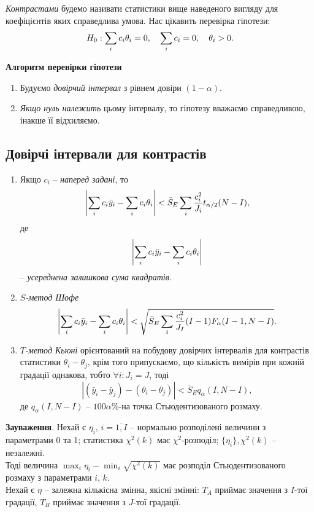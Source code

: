\textit{Контрастами} будемо називати статистики вище наведеного вигляду для коефіцієнтів яких справедлива умова. Нас цікавить перевірка гіпотези: \[H_0: \displaystyle\sum\limits_i c_i\theta_i=0, \quad \displaystyle\sum\limits_ic_i=0, \quad \theta_i>0.\]

\textbf{Алгоритм перевірки гіпотези}
\begin{enumerate}
	\item Будуємо \textit{довірчий інтервал} з рівнем довіри $(1-\alpha)$.
	\item \textit{Якщо нуль належить} цьому інтервалу, то гіпотезу вважаємо справедливою, інакше її відхиляємо.
\end{enumerate}

\subsection{Довірчі інтервали для контрастів}

\begin{enumerate}
	\item Якщо $c_i$ -- \textit{наперед задані}, то \[ \left|\displaystyle\sum\limits_ic_i\bar{y}_i-\displaystyle\sum\limits_ic_i\theta_i\right|<\bar{S}_E \displaystyle\sum\limits_i\dfrac{c_i^2}{J_i} t_{\alpha/2}(N-I), \] де \[\left|\displaystyle\sum\limits_ic_i\bar{y}_i-\displaystyle\sum\limits_ic_i\theta_i\right|\] -- \textit{усереднена залишкова сума квадратів}.

	\item \textit{$S$-метод Шофе} \[\left|\displaystyle\sum\limits_ic_i\bar{y}_i-\displaystyle\sum\limits_ic_i\theta_i\right|<\sqrt{\bar{S}_E\displaystyle\sum\limits_i\dfrac{c_i^2}{J_I}(I-1)F_\alpha(I-1,N-I)}. \]

	\item \textit{$T$-метод Кьюні} орієнтований на побудову довірчих інтервалів для контрастів статистики $\theta_i-\theta_j$, крім того припускаємо, що кількість вимірів при кожній градації однакова, тобто $\forall i: J_i = J$, тоді \[|(\bar{y}_i-\bar{y}_j)-(\theta_i-\theta_j)|<\bar{S}_Eq_\alpha(I,N-I),\] де $q_\alpha(I,N-I)$ -- $100\alpha\%$-на точка Стьюдентизованого розмаху.
\end{enumerate}

\textbf{Зауваження}. Нехай є $\eta_i$, $i =\overline{1, I}$ -- нормально розподілені величини з параметрами 0 та 1; статистика $\chi^2(k)$ має $\chi^2$-розподіл; $\{\eta_i\}, \chi^2(k)$ -- незалежні. \\

Тоді величина $\max_i \eta_i - \min_i \sqrt{\chi^2(k)}$ має розподіл Стьюдентизованого розмаху з параметрами $i$, $k$. \\

Нехай є $\eta$ -- залежна кількісна змінна, якісні змінні: $T_A$ приймає значення з $I$-тої градації, $T_B$ приймає значення з $J$-тої градації.\\

